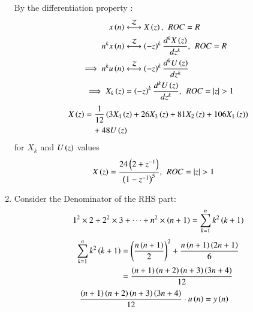 \documentclass[journal,12pt,twocolumn]{IEEEtran}
\theoremstyle{remark}
\begin{document}
\begin{enumerate}[label=\arabic*.]
By the differentiation property :
\begin{align}
x\brak{n} &\stackrel{\mathcal{Z}}{\longleftrightarrow} X\brak{z},\hspace{4pt} ROC = R\\
n^k x\brak{n} &\stackrel{\mathcal{Z}}{\longleftrightarrow} \brak{-z}^k \frac{d^kX\brak{z}}{dz^k},\hspace{4pt} ROC = R \\
\implies n^k u\brak{n} &\stackrel{\mathcal{Z}}{\longleftrightarrow} \brak{-z}^k \frac{d^kU\brak{z}}{dz^k}\\
    \implies X_k\brak{z} &=  \brak{-z}^k \frac{d^kU\brak{z}}{dz^k} , \hspace{4pt}ROC=|z|>1\label{eq:11.9.5.26.3} 
\end{align}
\begin{align}
X\left(z\right) &= \frac{1}{12}\left(3X_4\left(z\right) + 26X_3\left(z\right) + 81X_2\left(z\right) + 106X_1\left(z\right)\right) \label{eq:11.9.5.26.4} \notag \\
&\quad + 48U \left(z\right) 
\end{align}
 for $X_k$ and $U\left(z\right)$ values 
\begin{align}
    X\brak{z}&= \frac{24\brak{2+z^{-1}}}{\brak{1-z^{-1}}^5} ,\hspace{4pt} ROC=|z|>1
\end{align}
\item Consider the Denominator of the RHS part:
\begin{equation}
    1^2\times2 + 2^2\times3 +\dots + n^2\times\left(n+1\right) = \sum_{k=1}^n k^2\left(k+1\right)
\end{equation}
\begin{align}
           \sum_{k=1}^n k^2\left(k+1\right)&=  \left(\frac{n\left(n+1\right)}{2}\right)^{\scriptstyle 2}+\frac{n\left(n+1\right)\left(2n+1\right)}{6}\\
                           &= \frac{\left(n+1\right)\left(n+2\right)\left(n+3\right)\left(3n+4\right)}{12}
\end{align}
\begin{align}
    \frac{\left(n+1\right)\left(n+2\right)\left(n+3\right)\left(3n+4\right)}{12}\cdot u\left(n\right) &= y\left(n\right)\label{eq:11.9.5.26.5} 
\end{align}
\begin{figure}[h]
    \hspace{1cm}

\end{figure}
\end{enumerate}
\end{document}
